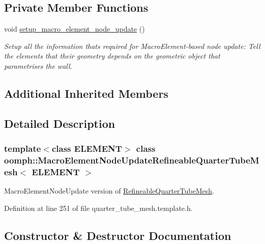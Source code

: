 \subsection*{Private Member Functions}
\begin{DoxyCompactItemize}
\item 
void \hyperlink{classoomph_1_1MacroElementNodeUpdateRefineableQuarterTubeMesh_ae98ab46cf2030928d805894dffe1b642}{setup\+\_\+macro\+\_\+element\+\_\+node\+\_\+update} ()
\begin{DoxyCompactList}\small\item\em Setup all the information that\textquotesingle{}s required for Macro\+Element-\/based node update\+: Tell the elements that their geometry depends on the geometric object that parametrises the wall. \end{DoxyCompactList}\end{DoxyCompactItemize}
\subsection*{Additional Inherited Members}


\subsection{Detailed Description}
\subsubsection*{template$<$class E\+L\+E\+M\+E\+NT$>$\newline
class oomph\+::\+Macro\+Element\+Node\+Update\+Refineable\+Quarter\+Tube\+Mesh$<$ E\+L\+E\+M\+E\+N\+T $>$}

Macro\+Element\+Node\+Update version of \hyperlink{classoomph_1_1RefineableQuarterTubeMesh}{Refineable\+Quarter\+Tube\+Mesh}. 

Definition at line 251 of file quarter\+\_\+tube\+\_\+mesh.\+template.\+h.



\subsection{Constructor \& Destructor Documentation}
\mbox{\label{classoomph_1_1MacroElementNodeUpdateRefineableQuarterTubeMesh_a05355134c7930d4aa73969f6c743ed17}} 
